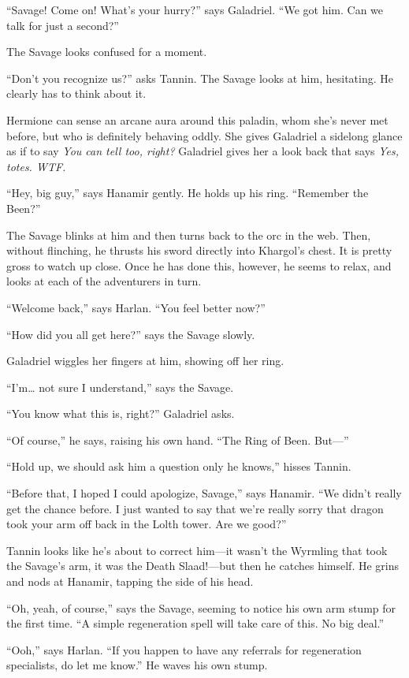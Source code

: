 \documentclass[smalldemyvopaper,11pt,twoside,onecolumn,openright,extrafontsizes]{memoir}
\begin{document}
``Savage! Come on! What's your hurry?'' says Galadriel. ``We got him.
Can we talk for just a second?''

The Savage looks confused for a moment.

``Don't you recognize us?'' asks Tannin. The Savage looks at him,
hesitating. He clearly has to think about it.

Hermione can sense an arcane aura around this paladin, whom she's never
met before, but who is definitely behaving oddly. She gives Galadriel a
sidelong glance as if to say \emph{You can tell too, right?} Galadriel
gives her a look back that says \emph{Yes, totes. WTF.}

``Hey, big guy,'' says Hanamir gently. He holds up his ring. ``Remember
the Been?''

The Savage blinks at him and then turns back to the orc in the web.
Then, without flinching, he thrusts his sword directly into Khargol's
chest. It is pretty gross to watch up close. Once he has done this,
however, he seems to relax, and looks at each of the adventurers in
turn.

``Welcome back,'' says Harlan. ``You feel better now?''

``How did you all get here?'' says the Savage slowly.

Galadriel wiggles her fingers at him, showing off her ring.

``I'm\ldots{} not sure I understand,'' says the Savage.

``You know what this is, right?'' Galadriel asks.

``Of course,'' he says, raising his own hand. ``The Ring of Been.
But---''

``Hold up, we should ask him a question only he knows,'' hisses Tannin.

``Before that, I hoped I could apologize, Savage,'' says Hanamir. ``We
didn't really get the chance before. I just wanted to say that we're
really sorry that dragon took your arm off back in the Lolth tower. Are
we good?''

Tannin looks like he's about to correct him---it wasn't the Wyrmling
that took the Savage's arm, it was the Death Slaad!---but then he
catches himself. He grins and nods at Hanamir, tapping the side of his
head.

``Oh, yeah, of course,'' says the Savage, seeming to notice his own arm
stump for the first time. ``A simple regeneration spell will take care
of this. No big deal.''

``Ooh,'' says Harlan. ``If you happen to have any referrals for
regeneration specialists, do let me know.'' He waves his own stump.
\end{document}
